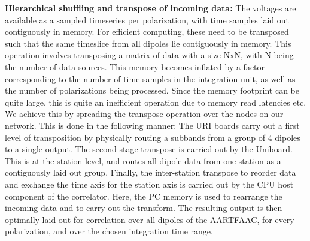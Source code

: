 \documentclass{ws-jai}
\begin{document}
\noindent \textbf {Hierarchical  shuffling and transpose of  incoming data:} The
voltages  are available  as a  sampled  timeseries per  polarization, with  time
samples laid out contiguously in memory.  For efficient computing, these need to
be transposed such that the same  timeslice from all dipoles lie contiguously in
memory. This  operation involves transposing a  matrix of data with  a size NxN,
with N  being the  number of data  sources.  This memory  becomes inflated  by a
factor corresponding to  the number of time-samples in the  integration unit, as
well as the number of polarizations  being processed. Since the memory footprint
can be quite  large, this is quite  an inefficient operation due  to memory read
latencies etc.\\

We  achieve this  by spreading  the transpose  operation over  the nodes  on our
network. This is done in the following  manner: The URI boards carry out a first
level  of transposition  by physically  routing  a subbands  from a  group of  4
dipoles to a  single output.  The second  stage transpose is carried  out by the
Uniboard.  This  is at the  station level, and routes  all dipole data  from one
station as a contiguously laid  out group.  Finally, the inter-station transpose
to reorder data and  exchange the time axis for the station  axis is carried out
by the  CPU host component  of the  correlator. Here, the  PC memory is  used to
rearrange the incoming data and to carry out the transform. The resulting output
is then optimally laid out for correlation over all dipoles of the AARTFAAC, for
every polarization, and over the chosen integration time range.

\end{document}
